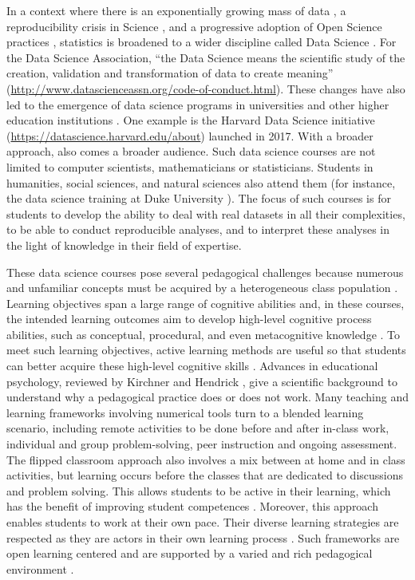 \documentclass{aims} %
\theoremstyle{definition}
\begin{document}
In a context where there is an exponentially growing mass of data
\cite{Marx2013}, a reproducibility crisis in Science \cite{Baker2016},
and a progressive adoption of Open Science practices \cite{Banks2019},
statistics is broadened to a wider discipline called Data Science
\cite{Cleveland2001}. For the Data Science Association, ``the Data
Science means the scientific study of the creation, validation and
transformation of data to create meaning''
(\url{http://www.datascienceassn.org/code-of-conduct.html}). These
changes have also led to the emergence of data science programs in
universities and other higher education institutions
\cite{Donoho2017, Cetinkaya-Rundel2021}. One example is the Harvard Data
Science initiative (\url{https://datascience.harvard.edu/about})
launched in 2017. With a broader approach, also comes a broader
audience. Such data science courses are not limited to computer
scientists, mathematicians or statisticians. Students in humanities,
social sciences, and natural sciences also attend them (for instance,
the data science training at Duke University
\cite{Cetinkaya-Rundel2021}). The focus of such courses is for students
to develop the ability to deal with real datasets in all their
complexities, to be able to conduct reproducible analyses, and to
interpret these analyses in the light of knowledge in their field of
expertise.

These data science courses pose several pedagogical challenges because
numerous and unfamiliar concepts must be acquired by a heterogeneous
class population \cite{Guzman2019}. Learning objectives span a large
range of cognitive abilities and, in these courses, the intended
learning outcomes aim to develop high-level cognitive process abilities,
such as conceptual, procedural, and even metacognitive knowledge
\cite{Krathwohl2002}. To meet such learning objectives, active learning
methods are useful so that students can better acquire these high-level
cognitive skills \cite{Freeman2014}. Advances in educational psychology,
reviewed by Kirchner and Hendrick \cite{Kirschner2020}, give a
scientific background to understand why a pedagogical practice does or
does not work. Many teaching and learning frameworks involving numerical
tools turn to a blended learning scenario, including remote activities
to be done before and after in-class work, individual and group
problem-solving, peer instruction and ongoing assessment. The flipped
classroom approach also involves a mix between at home and in class
activities, but learning occurs before the classes that are dedicated to
discussions and problem solving. This allows students to be active in
their learning, which has the benefit of improving student competences
\cite{Freeman2014}. Moreover, this approach enables students to work at
their own pace. Their diverse learning strategies are respected as they
are actors in their own learning process \cite{Spadafora2018}. Such
frameworks are open learning centered and are supported by a varied and
rich pedagogical environment \cite{Burton2011}.
\end{document}
